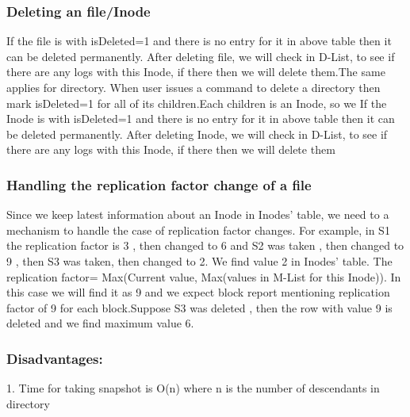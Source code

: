 \subsubsection{\textbf{Deleting an file/Inode}}
If the file is with isDeleted=1 and there is no entry for it in above table then it can be deleted permanently. After deleting file, we will check in D-List, to see if there are any logs with this Inode, if there then we will delete them.The same applies for directory. When user issues a command to delete a directory then mark isDeleted=1 for all of its children.Each children is an Inode, so we If the Inode is with isDeleted=1 and there is no entry for it in above table then it can be deleted permanently. After deleting Inode, we will check in D-List, to see if there are any logs with this Inode, if there then we will delete them

\subsubsection{\textbf{Handling the replication factor change of a file}}

Since we keep latest information about an Inode in Inodes’ table, we need to a mechanism to handle the case of replication factor changes. For example, in S1 the replication factor is 3 , then changed to 6 and S2 was taken , then changed to 9 , then S3 was taken, then changed to 2.
We find value 2 in Inodes’ table. The replication factor= Max(Current value, Max(values in M-List for this Inode)). In this case we will find it as 9 and we expect block report mentioning replication factor of 9 for each block.Suppose S3 was deleted , then the row with value 9 is deleted and we find maximum value 6. 

\subsubsection{\textbf{Disadvantages:}}
1. Time for taking snapshot is O(n) where n is the number of descendants  in directory 

